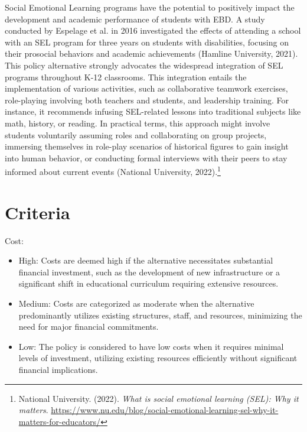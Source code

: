 \documentclass[11pt]{article}
\begin{document}
Social Emotional Learning programs have the potential to positively impact the development and academic performance of students with EBD. A study conducted by Espelage et al. in 2016 investigated the effects of attending a school with an SEL program for three years on students with disabilities, focusing on their prosocial behaviors and academic achievements (Hamline University, 2021). This policy alternative strongly advocates the widespread integration of SEL programs throughout K-12 classrooms. This integration entails the implementation of various activities, such as collaborative teamwork exercises, role-playing involving both teachers and students, and leadership training. For instance, it recommends infusing SEL-related lessons into traditional subjects like math, history, or reading. In practical terms, this approach might involve students voluntarily assuming roles and collaborating on group projects, immersing themselves in role-play scenarios of historical figures to gain insight into human behavior, or conducting formal interviews with their peers to stay informed about current events (National University, 2022).\footnote{National University. (2022). \textit{What is social emotional learning (SEL): Why it matters}. \url{https://www.nu.edu/blog/social-emotional-learning-sel-why-it-matters-for-educators/}}

\section{Criteria}

\noindent Cost:
\begin{itemize}
\item High: Costs are deemed high if the alternative necessitates substantial financial investment, such as the development of new infrastructure or a significant shift in educational curriculum requiring extensive resources.
\item Medium: Costs are categorized as moderate when the alternative predominantly utilizes existing structures, staff, and resources, minimizing the need for major financial commitments.
\item Low: The policy is considered to have low costs when it requires minimal levels of investment, utilizing existing resources efficiently without significant financial implications.
\end{itemize}
\end{document}
